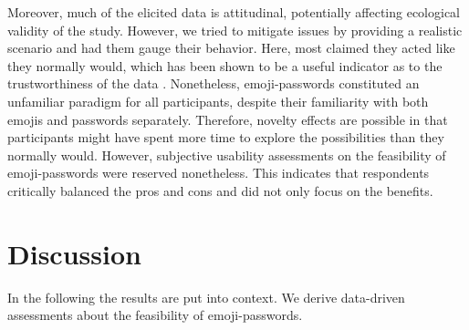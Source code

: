 Moreover, much of the elicited data is attitudinal, potentially affecting ecological validity of the study. However, we tried to mitigate issues by providing a realistic scenario and had them gauge their behavior. Here, most claimed they acted like they normally would, which has been shown to be a useful indicator as to the trustworthiness of the data \cite{Fahl2013EcologicalValidityPasswordStudy}. Nonetheless, emoji-passwords constituted an unfamiliar paradigm for all participants, despite their familiarity with both emojis and passwords separately. Therefore, novelty effects are possible in that participants might have spent more time to explore the possibilities than they normally would. However, subjective usability assessments on the feasibility of emoji-passwords were reserved nonetheless. This indicates that respondents critically balanced the pros and cons and did not only focus on the benefits.


\section{Discussion}
In the following the results are put into context. We derive data-driven assessments about the feasibility of emoji-passwords. 
